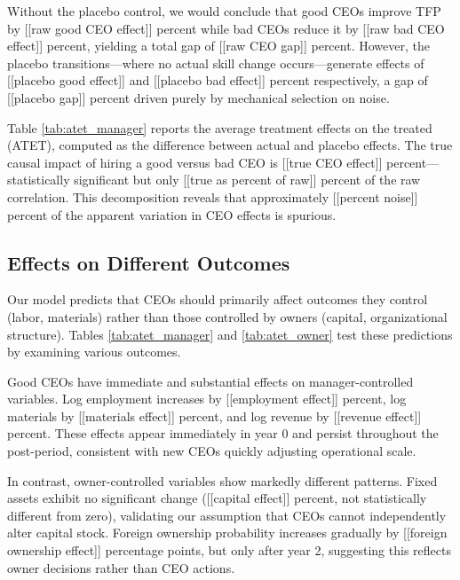 \documentclass[11pt,a4paper]{article}
\begin{document}
Without the placebo control, we would conclude that good CEOs improve TFP by [[raw good CEO effect]] percent while bad CEOs reduce it by [[raw bad CEO effect]] percent, yielding a total gap of [[raw CEO gap]] percent. However, the placebo transitions—where no actual skill change occurs—generate effects of [[placebo good effect]] and [[placebo bad effect]] percent respectively, a gap of [[placebo gap]] percent driven purely by mechanical selection on noise.

Table \ref{tab:atet_manager} reports the average treatment effects on the treated (ATET), computed as the difference between actual and placebo effects. The true causal impact of hiring a good versus bad CEO is [[true CEO effect]] percent—statistically significant but only [[true as percent of raw]] percent of the raw correlation. This decomposition reveals that approximately [[percent noise]] percent of the apparent variation in CEO effects is spurious.



\subsection{Effects on Different Outcomes}

Our model predicts that CEOs should primarily affect outcomes they control (labor, materials) rather than those controlled by owners (capital, organizational structure). Tables \ref{tab:atet_manager} and \ref{tab:atet_owner} test these predictions by examining various outcomes.

Good CEOs have immediate and substantial effects on manager-controlled variables. Log employment increases by [[employment effect]] percent, log materials by [[materials effect]] percent, and log revenue by [[revenue effect]] percent. These effects appear immediately in year 0 and persist throughout the post-period, consistent with new CEOs quickly adjusting operational scale.



In contrast, owner-controlled variables show markedly different patterns. Fixed assets exhibit no significant change ([[capital effect]] percent, not statistically different from zero), validating our assumption that CEOs cannot independently alter capital stock. Foreign ownership probability increases gradually by [[foreign ownership effect]] percentage points, but only after year 2, suggesting this reflects owner decisions rather than CEO actions.
\end{document}
